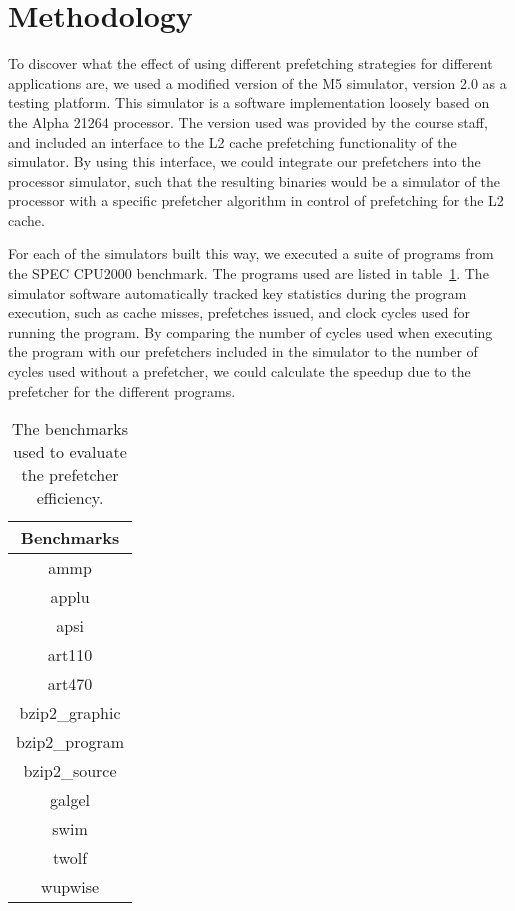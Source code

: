 
\section{Methodology}
\label{sec:methodology}

To discover what the effect of using different prefetching strategies
for different applications are, we used a modified version of the M5
simulator, version 2.0 \cite{M5} as a testing platform. This simulator
is a software implementation loosely based on the Alpha 21264
processor\cite{Alpha}. The version used was provided by the course
staff, and included an interface to the L2 cache prefetching
functionality of the simulator. By using this interface, we could
integrate our prefetchers into the processor simulator, such that the
resulting binaries would be a simulator of the processor with a
specific prefetcher algorithm in control of prefetching for the L2 cache.

For each of the simulators built this way, we executed a suite of
programs from the SPEC CPU2000 benchmark. The programs used are listed
in table~\ref{tab:benchmarks}. The simulator software automatically
tracked key statistics during the program execution, such as cache
misses, prefetches issued, and clock cycles used for running the
program. By comparing the number of cycles used when executing the
program with our prefetchers included in the simulator to the number
of cycles used without a prefetcher, we could calculate the speedup due to the prefetcher for the different programs.

\begin{table}[htbp]
  \centering
  \begin{tabular}{|c|}
    \hline
    {\bf Benchmarks} \\ \hline
    ammp \\ \hline
    applu \\ \hline
    apsi \\ \hline
    art110 \\ \hline
    art470 \\ \hline
    bzip2\_graphic \\ \hline
    bzip2\_program \\ \hline
    bzip2\_source \\ \hline
    galgel \\ \hline
    swim \\ \hline
    twolf \\ \hline
    wupwise \\ \hline
  \end{tabular}
  \caption{The benchmarks used to evaluate the prefetcher efficiency.}
  \label{tab:benchmarks}
\end{table}

